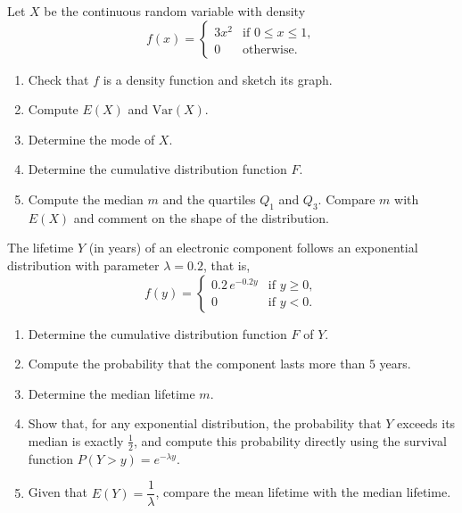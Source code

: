 \documentclass[11pt]{article}
\newcounter{popsec}
\newcounter{popsub}
\newcommand{\courssub}[1]{%
  \stepcounter{popsub}%
  \par\vspace{9pt}\noindent{\popxbold\fontsize{11.5}{13}\selectfont\color{popink}{\color{poporange}\thepopsec.\thepopsub}\hspace{6pt}#1}\par\nopagebreak\vspace{4pt}
}
\begin{document}
\courssub{I practise}

\begin{exercice}
Let $X$ be the continuous random variable with density
\[
f(x) = \begin{cases} 3x^2 & \text{if } 0 \leq x \leq 1, \\ 0 & \text{otherwise.} \end{cases}
\]
\begin{enumerate}
\item Check that $f$ is a density function and sketch its graph.
\item Compute $E(X)$ and $\mathrm{Var}(X)$.
\item Determine the mode of $X$.
\item Determine the cumulative distribution function $F$.
\item Compute the median $m$ and the quartiles $Q_1$ and $Q_3$. Compare $m$ with $E(X)$ and comment on the shape of the distribution.
\end{enumerate}
\end{exercice}

\begin{exercice}
The lifetime $Y$ (in years) of an electronic component follows an exponential distribution with parameter $\lambda = 0.2$, that is,
\[
f(y) = \begin{cases} 0.2\,e^{-0.2y} & \text{if } y \geq 0, \\ 0 & \text{if } y < 0. \end{cases}
\]
\begin{enumerate}
\item Determine the cumulative distribution function $F$ of $Y$.
\item Compute the probability that the component lasts more than $5$ years.
\item Determine the median lifetime $m$.
\item Show that, for any exponential distribution, the probability that $Y$ exceeds its median is exactly $\tfrac{1}{2}$, and compute this probability directly using the survival function $P(Y > y) = e^{-\lambda y}$.
\item Given that $E(Y) = \dfrac{1}{\lambda}$, compare the mean lifetime with the median lifetime.
\end{enumerate}
\end{exercice}
\end{document}
